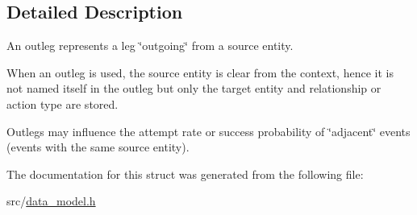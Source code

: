 \subsection{Detailed Description}
An outleg represents a leg \char`\"{}outgoing\char`\"{} from a source entity. 

When an outleg is used, the source entity is clear from the context, hence it is not named itself in the outleg but only the target entity and relationship or action type are stored.

Outlegs may influence the attempt rate or success probability of \char`\"{}adjacent\char`\"{} events (events with the same source entity). 

The documentation for this struct was generated from the following file\+:\begin{DoxyCompactItemize}
\item 
src/\hyperlink{data__model_8h}{data\+\_\+model.\+h}\end{DoxyCompactItemize}
